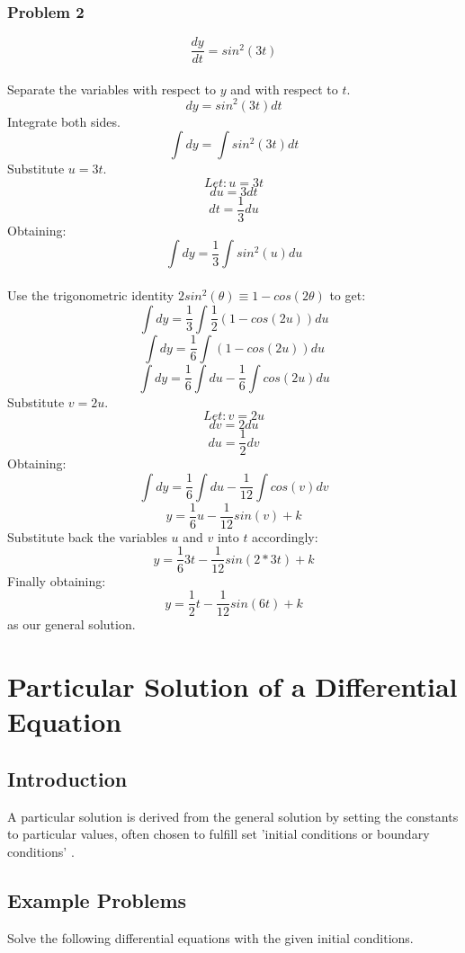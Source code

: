 \documentclass[hidelinks, a4paper, 12pt]{article}
\begin{document}
            \subsubsection{Problem 2}
                \[\frac{dy}{dt} = sin^2(3t)\]\\
                Separate the variables with respect to $y$ and with respect to $t$.
                \[dy = sin^2(3t)dt\]
                Integrate both sides.
                \[\int dy = \int sin^2(3t)dt\]
                Substitute $u = 3t$.
                \[Let: u = 3t\]
                \[du = 3dt\]
                \[dt = \frac{1}{3} du\]
                Obtaining:
                \[\int dy = \frac{1}{3}\int sin^2(u)du\]\\
                Use the trigonometric identity $2sin^2(\theta) \equiv 1 - cos(2\theta)$ to get:
                \[\int dy = \frac{1}{3}\int \frac{1}{2}(1-cos(2u))du\]
                \[\int dy = \frac{1}{6}\int (1-cos(2u))du\]
                \[\int dy = \frac{1}{6}\int du -\frac{1}{6}\int cos(2u)du\]
                Substitute $v = 2u$.
                \[Let: v = 2u\]
                \[dv = 2du\]
                \[du = \frac{1}{2} dv\]
                Obtaining:
                \[\int dy = \frac{1}{6}\int du -\frac{1}{12}\int cos(v)dv\]
                \[y = \frac{1}{6}u - \frac{1}{12}sin(v) + k\]
                Substitute back the variables $u$ and $v$ into $t$ accordingly:
                \[y = \frac{1}{6}3t - \frac{1}{12}sin(2*3t) + k\]
                Finally obtaining:
                \[y = \frac{1}{2}t - \frac{1}{12}sin(6t) + k\]
                as our general solution.
    \section{Particular Solution of a Differential Equation}    
        \subsection{Introduction}
            A particular solution is derived from the general solution by setting the constants to particular values, often chosen to fulfill set 'initial conditions or boundary conditions' \cite{kreyszig1999advanced}.
        \subsection{Example Problems}
            Solve the following differential equations with the given initial conditions.
\end{document}
